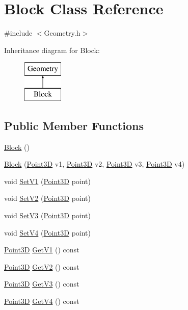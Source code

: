 \hypertarget{class_block}{}\section{Block Class Reference}
\label{class_block}


{\ttfamily \#include $<$Geometry.\+h$>$}

Inheritance diagram for Block\+:\begin{figure}[H]
\begin{center}
\leavevmode
\includegraphics[height=2.000000cm]{class_block}
\end{center}
\end{figure}
\subsection*{Public Member Functions}
\begin{DoxyCompactItemize}
\item 
\hyperlink{class_block_a37658a946bf5067ad01d68d9ff086adc}{Block} ()
\item 
\hyperlink{class_block_acce9cf128eb5fec928a9172e529e777f}{Block} (\hyperlink{class_point3_d}{Point3D} v1, \hyperlink{class_point3_d}{Point3D} v2, \hyperlink{class_point3_d}{Point3D} v3, \hyperlink{class_point3_d}{Point3D} v4)
\item 
void \hyperlink{class_block_ab70b247a67e1adb3370943c8393d6077}{Set\+V1} (\hyperlink{class_point3_d}{Point3D} point)
\item 
void \hyperlink{class_block_a1ad1834202712fe4c67e1af5f7ccd7fd}{Set\+V2} (\hyperlink{class_point3_d}{Point3D} point)
\item 
void \hyperlink{class_block_a01d25d342ed145e454bf976b7be7e562}{Set\+V3} (\hyperlink{class_point3_d}{Point3D} point)
\item 
void \hyperlink{class_block_aba65bfccbd291227fda20d10d49ae345}{Set\+V4} (\hyperlink{class_point3_d}{Point3D} point)
\item 
\hyperlink{class_point3_d}{Point3D} \hyperlink{class_block_aaa48ffa0a41fafeb85fb05ad856dbcfe}{Get\+V1} () const
\item 
\hyperlink{class_point3_d}{Point3D} \hyperlink{class_block_aa5050e8dd9b471e1d6844e075d5c6171}{Get\+V2} () const
\item 
\hyperlink{class_point3_d}{Point3D} \hyperlink{class_block_af163578ec4cec1fdea035df72812f95b}{Get\+V3} () const
\item 
\hyperlink{class_point3_d}{Point3D} \hyperlink{class_block_a288e90a1b2e3fe8fb111e45fc93ab75b}{Get\+V4} () const
\end{DoxyCompactItemize}


